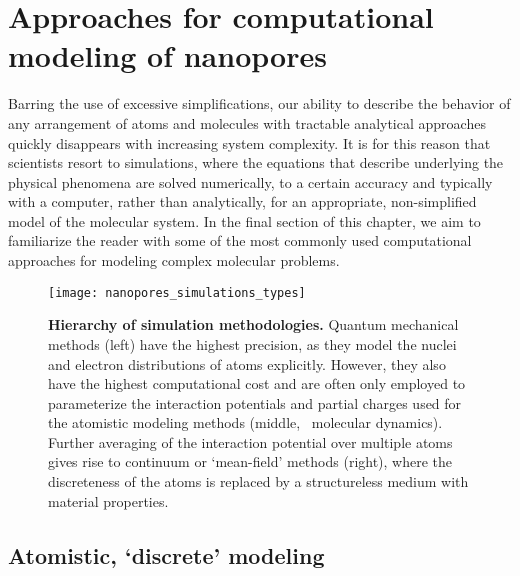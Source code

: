 %
%
%
%


\section{Approaches for computational modeling of nanopores}
%
\label{sec:np:modeling}
%

Barring the use of excessive simplifications, our ability to describe the behavior of any arrangement of atoms
and molecules with tractable analytical approaches quickly disappears with increasing system complexity. It is
for this reason that scientists resort to simulations, where the equations that describe underlying the
physical phenomena are solved numerically, to a certain accuracy and typically with a computer, rather than
analytically, for an appropriate, non-simplified model of the molecular system. In the final section of this
chapter, we aim to familiarize the reader with some of the most commonly used computational approaches for
modeling complex molecular problems.


%
\begin{figure*}[b]
  \centering
  
  \texttt{[image: nanopores\_simulations\_types]}

\caption[Hierarchy of simulation methodologies]{%
  \textbf{Hierarchy of simulation methodologies.}
  Quantum mechanical methods (left) have the highest precision, as they model the nuclei and electron
  distributions of atoms explicitly. However, they also have the highest computational cost and are often only
  employed to parameterize the interaction potentials and partial charges used for the atomistic modeling
  methods (middle, \eg~molecular dynamics). Further averaging of the interaction potential over multiple atoms
  gives rise to continuum or `mean-field' methods (right), where the discreteness of the atoms is replaced by
  a structureless medium with material properties.
  }\label{fig:nanopores_simulations_types}
\end{figure*}
%



\subsection{Atomistic, `discrete' modeling}
%

